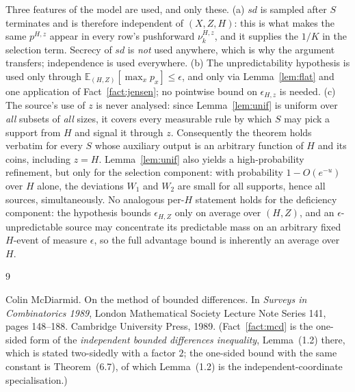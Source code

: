 \documentclass{aicr-solution}
\newcommand{\sd}{\mathit{sd}}
\begin{document}
\begin{remark}
Three features of the model are used, and only these. (a) $\sd$ is sampled after $S$ terminates and
is therefore independent of $(X,Z,H)$: this is what makes the same $p^{H,z}$ appear in every row's
pushforward $\nu^{H,z}_{k}$, and it supplies the $1/K$ in the selection term. Secrecy of $\sd$ is
\emph{not} used anywhere, which is why the argument transfers; independence is used everywhere. (b)
The unpredictability hypothesis is used only through $\mathbb{E}_{(H,Z)}[\max_x p_x] \le \epsilon$,
and only via Lemma~\ref{lem:flat} and one application of Fact~\ref{fact:jensen}; no pointwise bound on
$\epsilon_{H,z}$ is needed. (c) The source's use of $z$ is never analysed: since
Lemma~\ref{lem:unif} is uniform over \emph{all} subsets of \emph{all} sizes, it covers every
measurable rule by which $S$ may pick a support from $H$ and signal it through $z$. Consequently the
theorem holds verbatim for every $S$ whose auxiliary output is an arbitrary function of $H$ and its
coins, including $z = H$. Lemma~\ref{lem:unif} also yields a high-probability refinement, but only
for the selection component: with probability $1 - O(e^{-u})$ over $H$ alone, the deviations
$W_{1}$ and $W_{2}$ are small for all supports, hence all sources, simultaneously. No analogous per-$H$ statement holds for
the deficiency component: the hypothesis bounds $\epsilon_{H,Z}$ only on average over $(H,Z)$, and
an $\epsilon$-unpredictable source may concentrate its predictable mass on an arbitrary fixed $H$-event of
measure $\epsilon$, so the full advantage bound is inherently an average over $H$.
\end{remark}

\begin{aicrbibliography}{9}

Colin McDiarmid.
\newblock On the method of bounded differences.
\newblock In \emph{Surveys in Combinatorics 1989}, London Mathematical Society Lecture Note
Series 141, pages 148--188. Cambridge University Press, 1989.
\newblock (Fact~\ref{fact:mcd} is the one-sided form of the \emph{independent bounded differences
inequality}, Lemma~(1.2) there, which is stated two-sidedly with a factor $2$; the one-sided bound
with the same constant is Theorem~(6.7), of which Lemma~(1.2) is the independent-coordinate
specialisation.)

\end{aicrbibliography}
\end{document}
